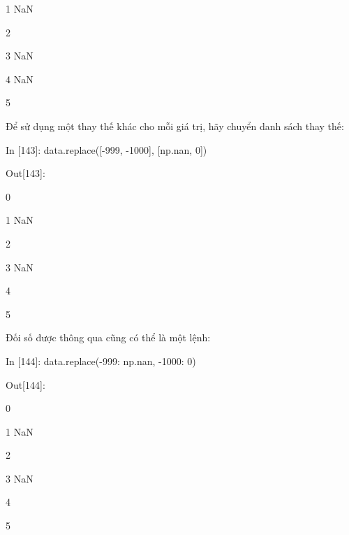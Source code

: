     \quad\textup{1   \quad  NaN  }\par
    \quad\textup{2  }\par
    \quad\textup{3  \quad NaN }\par
    \quad\textup{4 \quad  NaN }\par
    \quad\textup{5  }\par        
Để sử dụng một thay thế khác cho mỗi giá trị, hãy chuyển danh sách thay thế:\par
    \quad\textup{In [143]: data.replace([-999, -1000], [np.nan, 0])}\par
    \quad\textup{Out[143]:    }\par
    \quad\textup{0    }\par
    \quad\textup{1   \quad  NaN  }\par
    \quad\textup{2  }\par
    \quad\textup{3  \quad NaN }\par
    \quad\textup{4  }\par
    \quad\textup{5  }\par
Đối số được thông qua cũng có thể là một lệnh:\par
    \quad\textup{In [144]: data.replace({-999: np.nan, -1000: 0})}\par
    \quad\textup{Out[144]:    }\par
    \quad\textup{0    }\par
    \quad\textup{1   \quad  NaN  }\par
    \quad\textup{2  }\par
    \quad\textup{3  \quad NaN }\par
    \quad\textup{4  }\par
    \quad\textup{5  }\par

